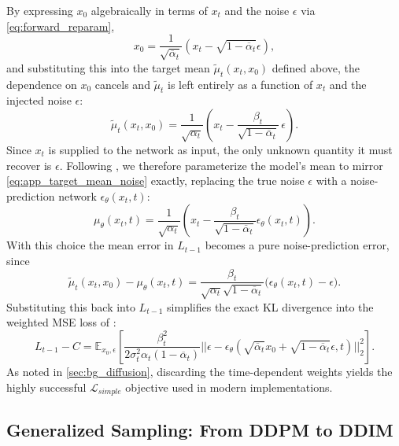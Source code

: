 By expressing $x_0$ algebraically in terms of $x_t$ and the noise $\epsilon$ via \autoref{eq:forward_reparam},
\begin{equation}
    x_0 = \frac{1}{\sqrt{\overline{\alpha}_t}}(x_t - \sqrt{1 - \overline{\alpha}_t}\epsilon),
\end{equation}
and substituting this into the target mean $\tilde{\mu}_t(x_t, x_0)$ defined above, the dependence on $x_0$ cancels and $\tilde{\mu}_t$ is left entirely as a function of $x_t$ and the injected noise $\epsilon$:
\begin{equation}
\label{eq:app_target_mean_noise}
    \tilde{\mu}_t(x_t, x_0) = \frac{1}{\sqrt{\alpha_t}} \left( x_t - \frac{\beta_t}{\sqrt{1-\overline{\alpha}_t}}\,\epsilon \right).
\end{equation}
Since $x_t$ is supplied to the network as input, the only unknown quantity it must recover is $\epsilon$. Following \textcite{ho_denoising_2020}, we therefore parameterize the model's mean to mirror \autoref{eq:app_target_mean_noise} exactly, replacing the true noise $\epsilon$ with a noise-prediction network $\epsilon_\theta(x_t, t)$:
\begin{equation}
\label{eq:app_mu_theta}
    \mu_\theta(x_t, t) = \frac{1}{\sqrt{\alpha_t}} \left( x_t - \frac{\beta_t}{\sqrt{1-\overline{\alpha}_t}} \epsilon_\theta(x_t, t) \right).
\end{equation}
With this choice the mean error in $L_{t-1}$ becomes a pure noise-prediction error, since
\begin{equation}
    \tilde{\mu}_t(x_t, x_0) - \mu_\theta(x_t, t) = \frac{\beta_t}{\sqrt{\alpha_t}\sqrt{1-\overline{\alpha}_t}}\big(\epsilon_\theta(x_t, t) - \epsilon\big).
\end{equation}
Substituting this back into $L_{t-1}$ simplifies the exact KL divergence into the weighted MSE loss of \textcite{ho_denoising_2020}:
\begin{equation}
    L_{t-1} - C = \mathbb{E}_{x_0, \epsilon} \left[ \frac{\beta_t^2}{2\sigma_t^2 \alpha_t (1-\overline{\alpha}_t)} ||\epsilon - \epsilon_\theta(\sqrt{\overline{\alpha}_t}x_0 + \sqrt{1-\overline{\alpha}_t}\epsilon, t)||_2^2 \right].
\end{equation}
As noted in \autoref{sec:bg_diffusion}, discarding the time-dependent weights yields the highly successful $\mathcal{L}_{simple}$ objective used in modern implementations.

\subsection{Generalized Sampling: From DDPM to DDIM}
\label{app:diffusion_sampling}

